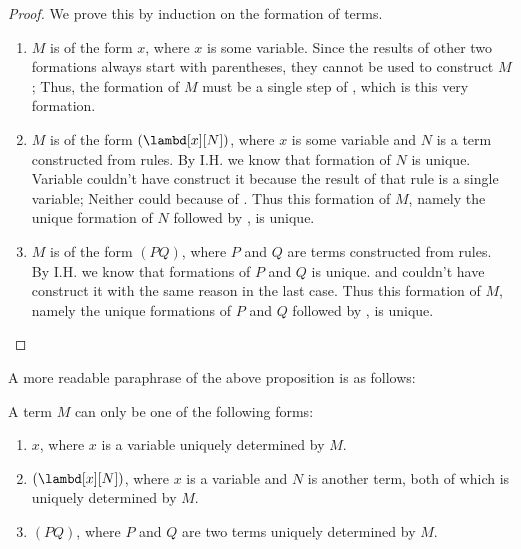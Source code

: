 \documentclass[../../../include/open-logic-section]{subfiles}
\begin{document}
\begin{proof}
  We prove this by induction on the formation of terms. 
  \begin{enumerate}
    \item $M$ is of the form
      $x$, where $x$ is some variable. Since the results of other two
      formations always start with parentheses, they cannot be used to
      construct $M$; Thus, the formation of $M$ must be a single step
      of , which is this very formation.
    \item $M$ is of the
      form $(\lambd[x][N])$, where $x$ is some variable and $N$ is a
      term constructed from rules. By I.H. we know that formation of
      $N$ is unique. Variable couldn't have construct it
      because the result of that rule is a single variable;
      Neither could  because of . Thus
      this formation of $M$, namely the unique formation of $N$
      followed by , is unique.

    \item  $M$ is of the form
      $(PQ)$, where $P$ and $Q$ are terms constructed from rules. By
      I.H. we know that formations of $P$ and $Q$ is unique.  and
       couldn't have construct it with the same reason in the 
      last case. Thus this formation of $M$, namely the unique
      formations of $P$ and $Q$ followed by , is unique.
  \end{enumerate}
\end{proof}

A more readable paraphrase of the above proposition is as follows:
\begin{prop}
  A term $M$ can only be one of the following forms:
  \begin{enumerate}
    \item $x$, where $x$ is a variable uniquely determined by $M$.
    \item $(\lambd[x][N])$, where $x$ is a variable and $N$ is
      another term, both of which is uniquely determined by $M$.
    \item $(PQ)$, where $P$ and $Q$ are two terms uniquely
      determined by $M$.
  \end{enumerate}
\end{prop}
\end{document}
